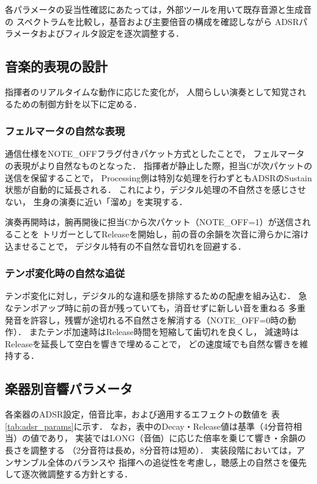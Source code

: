 各パラメータの妥当性確認にあたっては，外部ツールを用いて既存音源と生成音の
スペクトラムを比較し，基音および主要倍音の構成を確認しながら
ADSRパラメータおよびフィルタ設定を逐次調整する．


\subsection{音楽的表現の設計}

指揮者のリアルタイムな動作に応じた変化が，
人間らしい演奏として知覚されるための制御方針を以下に定める．

\subsubsection*{フェルマータの自然な表現}
通信仕様をNOTE\_OFFフラグ付きパケット方式としたことで，
フェルマータの表現がより自然なものとなった．
指揮者が静止した際，担当Cが次パケットの送信を保留することで，
Processing側は特別な処理を行わずともADSRのSustain状態が自動的に延長される．
これにより，デジタル処理の不自然さを感じさせない，
生身の演奏に近い「溜め」を実現する．

演奏再開時は，腕再開後に担当Cから次パケット（NOTE\_OFF=1）が送信されることを
トリガーとしてReleaseを開始し，前の音の余韻を次音に滑らかに溶け込ませることで，
デジタル特有の不自然な音切れを回避する．

\subsubsection*{テンポ変化時の自然な追従}
テンポ変化に対し，デジタル的な違和感を排除するための配慮を組み込む．
急なテンポアップ時に前の音が残っていても，消音せずに新しい音を重ねる
多重発音を許容し，残響が途切れる不自然さを解消する（NOTE\_OFF=0時の動作）．
またテンポ加速時はRelease時間を短縮して歯切れを良くし，
減速時はReleaseを延長して空白を響きで埋めることで，
どの速度域でも自然な響きを維持する．


\subsection{楽器別音響パラメータ}

各楽器のADSR設定，倍音比率，および適用するエフェクトの数値を
表\,\ref{tab:adsr_params}に示す．
なお，表中のDecay・Release値は基準（4分音符相当）の値であり，
実装ではLONG（音価）に応じた倍率を乗じて響き・余韻の長さを調整する
（2分音符は長め，8分音符は短め）．
実装段階においては，アンサンブル全体のバランスや
指揮への追従性を考慮し，聴感上の自然さを優先して逐次微調整する方針とする．

